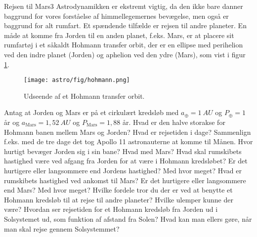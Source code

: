 \begin{opgave}{Rejsen til Mars}{3}
Astrodynamikken er ekstremt vigtig, da den ikke bare danner baggrund for vores forståelse af himmellegemernes bevægelse, men også er baggrund for alt rumfart. Et spændende tilfælde er rejsen til andre planeter. En måde at komme fra Jorden til en anden planet, f.eks. Mars, er at placere sit rumfartøj i et såkaldt Hohmann transfer orbit, der er en ellipse med perihelion ved den indre planet (Jorden) og aphelion ved den ydre (Mars), som vist i figur \ref{fig:hohmann}.

\begin{figure}[h]
	\centering
	\texttt{[image: astro/fig/hohmann.png]}
	\caption{Udseende af et Hohmann transfer orbit.}
	\label{fig:hohmann}
\end{figure}
Antag at Jorden og Mars er på et cirkulært kredsløb med $a_\oplus=1~\si{AU}$ og $P_\oplus=1$ år og $a_\text{Mars}=1,52~\si{AU}$ og $P_\text{Mars}=1,88$ år.
	\opg
	Hvad er den halve storakse for Hohmann banen mellem Mars og Jorden?
	\opg
	Hvad er rejsetiden i dage? Sammenlign f.eks. med de tre dage det tog Apollo 11 astronauterne at komme til Månen.
	\opg
	Hvor hurtigt bevæger Jorden sig i sin bane? Hvad med Mars?
	\opg
	Hvad skal rumskibets hastighed være ved afgang fra Jorden for at være i Hohmann kredsløbet?
	\opg
	Er det hurtigere eller langsommere end Jordens hastighed? Med hvor meget?
	\opg
	Hvad er rumskibets hastighed ved ankomst til Mars?
	\opg
	Er det hurtigere eller langsommere end Mars? Med hvor meget?
	\opg
	Hvilke fordele tror du der er ved at benytte et Hohmann kredsløb til at rejse til andre planeter?
	\opg
	Hvilke ulemper kunne der være? 
	\opg
	Hvordan ser rejsetiden for et Hohmann kredsløb fra Jorden ud i Solsystemet ud, som funktion af afstand fra Solen?
	\opg
	Hvad kan man ellers gøre, når man skal rejse gennem Solsystemmet?	
\end{opgave}


